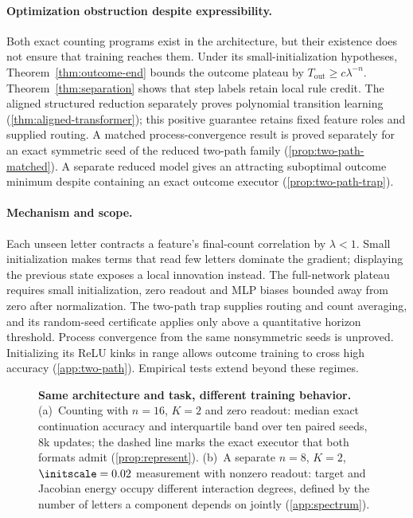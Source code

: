 \paragraph{Optimization obstruction despite expressibility.}
Both exact counting programs exist in the architecture, but their existence does
not ensure that training reaches them. Under its small-initialization hypotheses,
Theorem~\ref{thm:outcome-end} bounds the outcome plateau by
$T_{\mathrm{out}}\ge c\lambda^{-n}$. Theorem~\ref{thm:separation} shows that
step labels retain local rule credit. The aligned structured reduction separately
proves polynomial transition learning (\cref{thm:aligned-transformer}); this
positive guarantee retains fixed feature roles and supplied routing.
A matched process-convergence result is proved separately for an exact symmetric
seed of the reduced two-path family (\cref{prop:two-path-matched}).
A separate reduced model gives an attracting suboptimal outcome minimum despite
containing an exact outcome executor (\cref{prop:two-path-trap}).

\paragraph{Mechanism and scope.}
Each unseen letter contracts a feature's final-count correlation by $\lambda<1$.
Small initialization makes terms that read few letters dominate the gradient;
displaying the previous state exposes a local innovation instead.
The full-network plateau requires small initialization, zero readout and MLP
biases bounded away from zero after normalization. The two-path trap supplies
routing and count averaging, and its random-seed certificate applies only above a quantitative horizon
threshold. Process convergence from the same nonsymmetric seeds is unproved. Initializing its ReLU kinks in range allows outcome training
to cross high accuracy (\cref{app:two-path}). Empirical tests extend beyond these regimes.

\begin{figure}[t]
\centering

\caption{\textbf{Same architecture and task, different training behavior.}
(a)~Counting with $n=16$, $K=2$ and zero readout: median exact continuation accuracy and interquartile band over ten paired seeds, $8$k
updates; the dashed line marks the exact executor that both formats admit (\cref{prop:represent}).
(b)~A separate $n=8$, $K=2$, $\initscale=0.02$ measurement with nonzero readout: target and Jacobian energy occupy different interaction degrees, defined by the number of letters a component depends on jointly (\cref{app:spectrum}).}
\label{fig:overview}
\end{figure}

